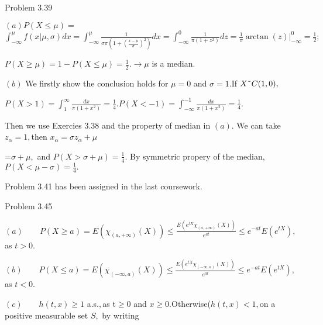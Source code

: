 \documentclass{article}
\begin{document}

Problem 3.39

$\left( a\right) P\left( X\leq \mu \right) =$ $\int_{-\infty }^{\mu }f\left(
x|\mu ,\sigma \right) dx=\int_{-\infty }^{\mu }\frac{1}{\sigma \pi \left(
1+\left( \frac{x-\mu }{\sigma }\right) ^{2}\right) }dx=\int_{-\infty }^{0}%
\frac{1}{\pi \left( 1+z^{2}\right) }dz=\frac{1}{\pi }\arctan \left( z\right)
|_{-\infty }^{0}=\frac{1}{2};$

$P\left( X\geq \mu \right) =1-P\left( X\leq \mu \right) =\frac{1}{2}%
.\rightarrow \mu $ is a median.

$\left( b\right) $ We firstly show the conclusion holds for $\mu =0$ and $%
\sigma =1.$If $X\symbol{126}C(1,0),$

$P\left( X>1\right) =\int_{1}^{\infty }\frac{dx}{\pi \left( 1+x^{2}\right) }=%
\frac{1}{4}.P\left( X<-1\right) =\int_{-\infty }^{-1}\frac{dx}{\pi \left(
1+x^{2}\right) }=\frac{1}{4}.$

Then we use Exercies 3.38 and the property of median in $\left( a\right) .$
We can take $z_{\alpha }=1,$then $x_{\alpha }=\sigma z_{\alpha }+\mu $

=$\sigma +\mu ,$ and $P\left( X>\sigma +\mu \right) =\frac{1}{4}.$ By
symmetric propery of the median,  $P\left( X<\mu -\sigma \right) =\frac{1}{4}%
.$

Problem 3.41 has been assigned in the last coursework. 

Problem 3.45

$\left( a\right) \qquad P\left( X\geq a\right) =E\left( \chi _{\left(
a,+\infty \right) }\left( X\right) \right) \leq \frac{E\left( e^{tX}\chi
_{\left( a,+\infty \right) }\left( X\right) \right) }{e^{at}}\leq
e^{-at}E\left( e^{tX}\right) ,$as $t>0.$

$\left( b\right) \qquad P\left( X\leq a\right) =E\left( \chi _{\left(
-\infty ,a\right) }\left( X\right) \right) \leq \frac{E\left( e^{tX}\chi
_{\left( -\infty ,a\right) }\left( X\right) \right) }{e^{at}}\leq
e^{-at}E\left( e^{tX}\right) ,$as $t<0.$

$\left( c\right) \qquad h\left( t,x\right) \geq 1$ a.s.$,$as t$\geq 0$ and $%
x\geq 0.$Otherwise($h\left( t,x\right) <1,$on a positive measurable set $S,$%
by writing
\end{document}
